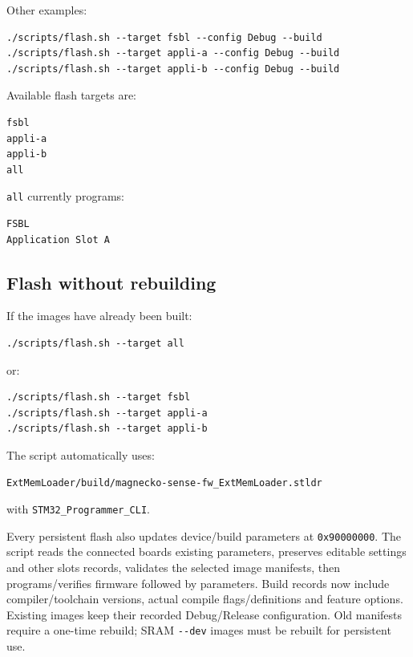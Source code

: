 \documentclass[10pt,a4paper,oneside]{report}
\begin{document}
Other examples:

\begin{verbatim}
./scripts/flash.sh --target fsbl --config Debug --build
./scripts/flash.sh --target appli-a --config Debug --build
./scripts/flash.sh --target appli-b --config Debug --build
\end{verbatim}

Available flash targets are:

\begin{verbatim}
fsbl
appli-a
appli-b
all
\end{verbatim}

\texttt{all} currently programs:

\begin{verbatim}
FSBL
Application Slot A
\end{verbatim}

\subsection{Flash without rebuilding}\label{wiki-getting-started-build-flash-debug--flash-without-rebuilding}

If the images have already been built:

\begin{verbatim}
./scripts/flash.sh --target all
\end{verbatim}

or:

\begin{verbatim}
./scripts/flash.sh --target fsbl
./scripts/flash.sh --target appli-a
./scripts/flash.sh --target appli-b
\end{verbatim}

The script automatically uses:

\begin{verbatim}
ExtMemLoader/build/magnecko-sense-fw_ExtMemLoader.stldr
\end{verbatim}

with \texttt{STM32\_\allowbreak{}Programmer\_\allowbreak{}CLI}.

Every persistent flash also updates device/build parameters at \texttt{0x90000000}. The script reads the connected board\textquotesingle s existing parameters, preserves editable settings and other slots\textquotesingle{} records, validates the selected image manifests, then programs/verifies firmware followed by parameters. Build records now include compiler/toolchain versions, actual compile flags/definitions and feature options. Existing images keep their recorded Debug/Release configuration. Old manifests require a one-time rebuild; SRAM \texttt{-\allowbreak{}-\allowbreak{}dev} images must be rebuilt for persistent use.
\end{document}
